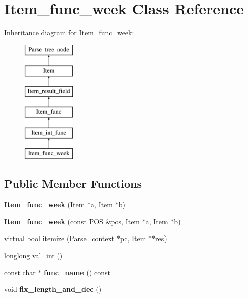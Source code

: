 \hypertarget{classItem__func__week}{}\section{Item\+\_\+func\+\_\+week Class Reference}
\label{classItem__func__week}
Inheritance diagram for Item\+\_\+func\+\_\+week\+:\begin{figure}[H]
\begin{center}
\leavevmode
\includegraphics[height=6.000000cm]{classItem__func__week}
\end{center}
\end{figure}
\subsection*{Public Member Functions}
\begin{DoxyCompactItemize}
\item 
\mbox{\label{classItem__func__week_ab39980bc10c69b686aab0bfacd63584c}} 
{\bfseries Item\+\_\+func\+\_\+week} (\mbox{\hyperlink{classItem}{Item}} $\ast$a, \mbox{\hyperlink{classItem}{Item}} $\ast$b)
\item 
\mbox{\label{classItem__func__week_a70721671129c8eebfa8a072ac17b9a5b}} 
{\bfseries Item\+\_\+func\+\_\+week} (const \mbox{\hyperlink{structYYLTYPE}{P\+OS}} \&pos, \mbox{\hyperlink{classItem}{Item}} $\ast$a, \mbox{\hyperlink{classItem}{Item}} $\ast$b)
\item 
virtual bool \mbox{\hyperlink{classItem__func__week_ae0faa47bfc4b7e52ce370ba9f0a49db4}{itemize}} (\mbox{\hyperlink{structParse__context}{Parse\+\_\+context}} $\ast$pc, \mbox{\hyperlink{classItem}{Item}} $\ast$$\ast$res)
\item 
longlong \mbox{\hyperlink{classItem__func__week_a3595e7912d6f7e80ab35b89c7345ed5b}{val\+\_\+int}} ()
\item 
\mbox{\label{classItem__func__week_a3a8dc7abbf4c26d5b4db2dbe3fa8c6e0}} 
const char $\ast$ {\bfseries func\+\_\+name} () const
\item 
\mbox{\label{classItem__func__week_aca1e90b124868fb7b2216961a80bd987}} 
void {\bfseries fix\+\_\+length\+\_\+and\+\_\+dec} ()
\end{DoxyCompactItemize}
